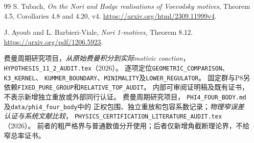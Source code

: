 \documentclass[11pt,a4paper]{ctexart}
\theoremstyle{cnplain}\newtheorem{theorem}{定理}[section]
\theoremstyle{definition}\newtheorem{definition}[theorem]{定义}
\theoremstyle{remark}\newtheorem{remark}[theorem]{注}
\begin{document}
\begin{thebibliography}{99}
 S. Tubach,
\emph{On the Nori and Hodge realisations of Voevodsky motives},
Theorem 4.5, Corollaries 4.8 and 4.20, v4.
\url{https://arxiv.org/html/2309.11999v4}.

 J. Ayoub and L. Barbieri-Viale,
\emph{Nori 1-motives}, Theorem 8.12.
\url{https://arxiv.org/pdf/1206.5923}.

 费曼周期研究项目，\emph{从原始费曼积分到实际motivic coaction}，
\texttt{HYPOTHESIS\_11\_2\_AUDIT.tex}（2026）。
逐项定位\texttt{GEOMETRIC\_COMPARISON}、\texttt{K3\_KERNEL}、
\texttt{KUMMER\_BOUNDARY}、\texttt{MINIMALITY}及\texttt{LOWER\_REGULATOR}。
固定群与P8另依赖\texttt{FIXED\_PURE\_GROUP}和\texttt{RELATIVE\_TOP\_AUDIT}。
内部可审阅证明稿及既有证书，不表示新增独立重放或外部同行认证。
 费曼周期研究项目，
\texttt{PHI4\_FOUR\_BODY.md}及\texttt{data/phi4\_four\_body}中的
正权包围、独立重放和包容系数记录；\emph{物理窄误差认证与系统文献比较}，
\texttt{PHYSICS\_CERTIFICATION\_LITERATURE\_AUDIT.tex}（2026）。
前者的粗严格界与普通数值分开使用；后者仅新增角截断理论界，不给窄总率证书。

\end{thebibliography}
\end{document}
